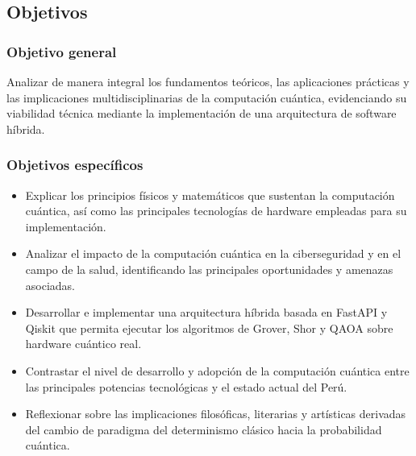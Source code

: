 \documentclass[12pt,a4paper]{article}
\begin{document}
\subsection*{Objetivos}

\subsubsection*{Objetivo general}
Analizar de manera integral los fundamentos teóricos, las aplicaciones prácticas y las implicaciones multidisciplinarias de la computación cuántica, evidenciando su viabilidad técnica mediante la implementación de una arquitectura de software híbrida.

\subsubsection*{Objetivos específicos}
\begin{itemize}
    \item Explicar los principios físicos y matemáticos que sustentan la computación cuántica, así como las principales tecnologías de hardware empleadas para su implementación.
    \item Analizar el impacto de la computación cuántica en la ciberseguridad y en el campo de la salud, identificando las principales oportunidades y amenazas asociadas.
    \item Desarrollar e implementar una arquitectura híbrida basada en FastAPI y Qiskit que permita ejecutar los algoritmos de Grover, Shor y QAOA sobre hardware cuántico real.
    \item Contrastar el nivel de desarrollo y adopción de la computación cuántica entre las principales potencias tecnológicas y el estado actual del Perú.
    \item Reflexionar sobre las implicaciones filosóficas, literarias y artísticas derivadas del cambio de paradigma del determinismo clásico hacia la probabilidad cuántica.
\end{itemize}
\end{document}
